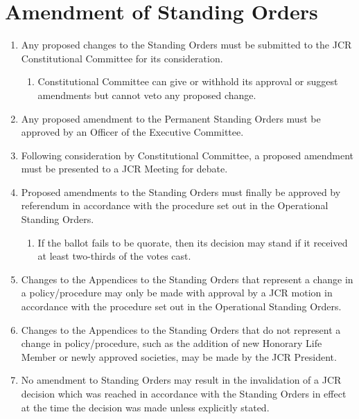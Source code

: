 \documentclass[12pt]{article}  %
\begin{document}
\section{Amendment of Standing Orders}
\begin{enumerate}
    \item Any proposed changes to the Standing Orders must be submitted to the JCR Constitutional Committee for its consideration.
    \begin{enumerate}
        \item Constitutional Committee can give or withhold its approval or suggest amendments but cannot veto any proposed change.
    \end{enumerate}
    \item Any proposed amendment to the Permanent Standing Orders must be approved by an Officer of the Executive Committee.
    \item Following consideration by Constitutional Committee, a proposed amendment must be presented to a JCR Meeting for debate.
    \item Proposed amendments to the Standing Orders must finally be approved by referendum in accordance with the procedure set out in the Operational Standing Orders.
    \begin{enumerate}
        \item If the ballot fails to be quorate, then its decision may stand if it received at least two-thirds of the votes cast.
    \end{enumerate}
    \item Changes to the Appendices to the Standing Orders that represent a change in a policy/procedure may only be made with approval by a JCR motion in accordance with the procedure set out in the Operational Standing Orders.
    \item Changes to the Appendices to the Standing Orders that do not represent a change in policy/procedure, such as the addition of new Honorary Life Member or newly approved societies, may be made by the JCR President.
    \item No amendment to Standing Orders may result in the invalidation of a JCR decision which was reached in accordance with the Standing Orders in effect at the time the decision was made unless explicitly stated.
\end{enumerate}
\newpage
\end{document}
